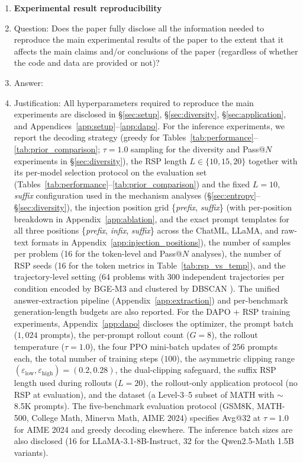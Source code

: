 \begin{enumerate}
    \item {\bf Experimental result reproducibility}
    \item[] Question: Does the paper fully disclose all the information needed to reproduce the main experimental results of the paper to the extent that it affects the main claims and/or conclusions of the paper (regardless of whether the code and data are provided or not)?
    \item[] Answer: \answerYes{}
    \item[] Justification: All hyperparameters required to reproduce the main experiments are disclosed in \S\ref{sec:setup}, \S\ref{sec:diversity}, \S\ref{sec:application}, and Appendices~\ref{app:setup}--\ref{app:dapo}. For the inference experiments, we report the decoding strategy (greedy for Tables~\ref{tab:performance}--\ref{tab:prior_comparison}; $\tau=1.0$ sampling for the diversity and Pass@$N$ experiments in \S\ref{sec:diversity}), the RSP length $L\in\{10,15,20\}$ together with its per-model selection protocol on the evaluation set (Tables~\ref{tab:performance}--\ref{tab:prior_comparison}) and the fixed $L=10$, \textit{suffix} configuration used in the mechanism analyses (\S\ref{sec:entropy}--\S\ref{sec:diversity}), the injection position grid \{\textit{prefix}, \textit{suffix}\} (with per-position breakdown in Appendix~\ref{app:ablation}, and the exact prompt templates for all three positions \{\textit{prefix}, \textit{infix}, \textit{suffix}\} across the ChatML, LLaMA, and raw-text formats in Appendix~\ref{app:injection_positions}), the number of samples per problem (16 for the token-level and Pass@$N$ analyses), the number of RSP seeds (16 for the token metrics in Table~\ref{tab:rsp_vs_temp}), and the trajectory-level setting (64 problems with 300 independent trajectories per condition encoded by BGE-M3 \citep{chen2024bge} and clustered by DBSCAN \citep{ester1996density}). The unified answer-extraction pipeline (Appendix~\ref{app:extraction}) and per-benchmark generation-length budgets are also reported. For the DAPO + RSP training experiments, Appendix~\ref{app:dapo} discloses the optimizer, the prompt batch ($1{,}024$ prompts), the per-prompt rollout count ($G=8$), the rollout temperature ($\tau=1.0$), the four PPO mini-batch updates of $256$ prompts each, the total number of training steps ($100$), the asymmetric clipping range $(\varepsilon_{\text{low}}, \varepsilon_{\text{high}})=(0.2, 0.28)$, the dual-clipping safeguard, the suffix RSP length used during rollouts ($L=20$), the rollout-only application protocol (no RSP at evaluation), and the dataset (a Level-3--5 subset of MATH with $\sim$8.5K prompts). The five-benchmark evaluation protocol (GSM8K, MATH-500, College Math, Minerva Math, AIME 2024) specifies Avg@32 at $\tau=1.0$ for AIME 2024 and greedy decoding elsewhere. The inference batch sizes are also disclosed (16 for LLaMA-3.1-8B-Instruct, 32 for the Qwen2.5-Math 1.5B variants).


\end{enumerate}

